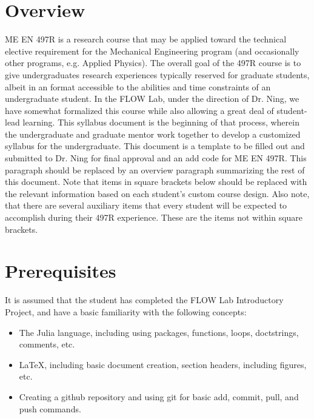 \documentclass[12pt]{article}
\begin{document}
\section{Overview}
\label{sec:overview}

ME EN 497R is a research course that may be applied toward the technical elective requirement for the Mechanical Engineering program (and occasionally other programs, e.g. Applied Physics).
The overall goal of the 497R course is to give undergraduates research experiences typically reserved for graduate students, albeit in an format accessible to the abilities and time constraints of an undergraduate student.
In the FLOW Lab, under the direction of Dr. Ning, we have somewhat formalized this course while also allowing a great deal of student-lead learning.
This syllabus document is the beginning of that process, wherein the undergraduate and graduate mentor work together to develop a customized syllabus for the undergraduate.
This document is a template to be filled out and submitted to Dr. Ning for final approval and an add code for ME EN 497R.
This paragraph should be replaced by an overview paragraph summarizing the rest of this document.
Note that items in square brackets below should be replaced with the relevant information based on each student's custom course design.
Also note, that there are several auxiliary items that every student will be expected to accomplish during their 497R experience.  These are the items not within square brackets.





\section{Prerequisites}
\label{sec:prerequisites}

It is assumed that the student has completed the FLOW Lab Introductory Project, and have a basic familiarity with the following concepts:

\begin{itemize}
	\item The Julia language, including using packages, functions, loops, doctstrings, comments, etc.
	\item LaTeX, including basic document creation, section headers, including figures, etc.
	\item Creating a github repository and using git for basic add, commit, pull, and push commands.	
\end{itemize}
\end{document}
